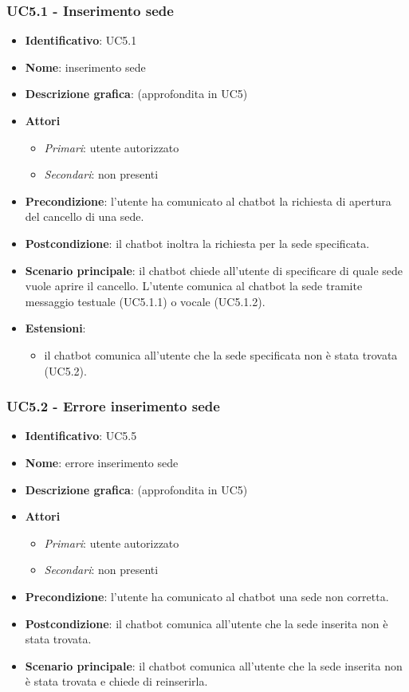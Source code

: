 \subsubsection{UC5.1 - Inserimento sede}
\begin{itemize}
    \item \textbf{Identificativo}: UC5.1
    \item \textbf{Nome}: inserimento sede
    \item \textbf{Descrizione grafica}: (approfondita in UC5)
    \item \textbf{Attori}
 \begin{itemize} 
    \item \textit{Primari}: utente autorizzato 
    \item \textit{Secondari}: non presenti
 \end{itemize}
 \item \textbf{Precondizione}: l'utente ha comunicato al chatbot la richiesta di apertura del cancello di una sede.
 \item \textbf{Postcondizione}: il chatbot inoltra la richiesta per la sede specificata.
 \item \textbf{Scenario principale}: il chatbot chiede all'utente di specificare di quale sede vuole aprire il cancello. L'utente comunica al chatbot la sede tramite messaggio testuale (UC5.1.1) o vocale (UC5.1.2).
\item \textbf{Estensioni}: 
 \begin{itemize} 
    \item il chatbot comunica all'utente che la sede specificata non è stata trovata (UC5.2).
 \end{itemize}
\end{itemize}
\subsubsection{UC5.2 - Errore inserimento sede}
\begin{itemize}
    \item \textbf{Identificativo}: UC5.5
    \item \textbf{Nome}: errore inserimento sede
    \item \textbf{Descrizione grafica}: (approfondita in UC5)
    \item \textbf{Attori}
 \begin{itemize} 
    \item \textit{Primari}: utente autorizzato 
    \item \textit{Secondari}: non presenti
 \end{itemize}
 \item \textbf{Precondizione}: l'utente ha comunicato al chatbot una sede non corretta.
 \item \textbf{Postcondizione}: il chatbot comunica all'utente che la sede inserita non è stata trovata.
 \item \textbf{Scenario principale}: il chatbot comunica all'utente che la sede inserita non è stata trovata e chiede di reinserirla.
\end{itemize}
\newpage